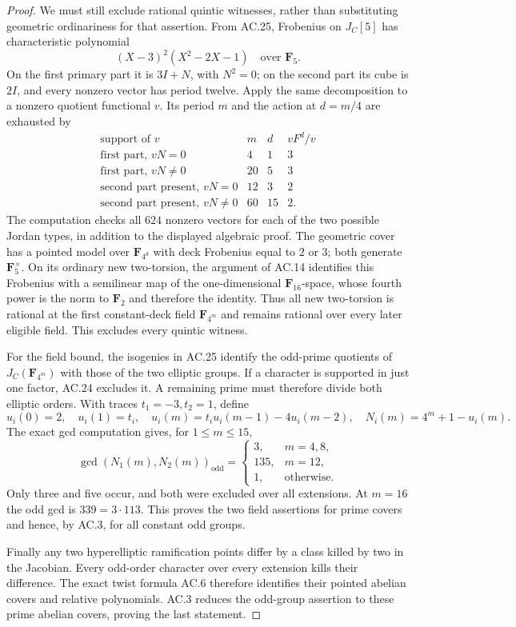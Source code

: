 \begin{proof}
We must still exclude rational quintic witnesses, rather than
substituting geometric ordinariness for that assertion.  From AC.25,
Frobenius on $J_C[5]$ has characteristic polynomial
\[
                   (X-3)^2(X^2-2X-1)\quad\text{over }\mathbf F_5.
\]
On the first primary part it is $3I+N$, with $N^2=0$; on the second
part its cube is $2I$, and every nonzero vector has period twelve.
Apply the same decomposition to a nonzero quotient functional $v$.
Its period $m$ and the action at $d=m/4$ are exhausted by
\[
 \begin{array}{c|c|c|c}
 \text{support of }v&m&d&vF^d/v\\\hline
 \text{first part, }vN=0&4&1&3\\
 \text{first part, }vN\ne0&20&5&3\\
 \text{second part present, }vN=0&12&3&2\\
 \text{second part present, }vN\ne0&60&15&2.
 \end{array}
\]
The computation checks all $624$ nonzero vectors for each of the two
possible Jordan types, in addition to the displayed algebraic proof.
The geometric cover has a pointed model over $\mathbf F_{4^d}$ with
deck Frobenius equal to $2$ or $3$; both generate
$\mathbf F_5^\times$.  On its ordinary new two-torsion, the argument
of AC.14 identifies this Frobenius with a semilinear map of the
one-dimensional $\mathbf F_{16}$-space, whose fourth power is the
norm to $\mathbf F_2$ and therefore the identity.  Thus all new
two-torsion is rational at the first constant-deck field
$\mathbf F_{4^m}$ and remains rational over every later eligible
field.  This excludes every quintic witness.

For the field bound, the isogenies in AC.25 identify the odd-prime
quotients of $J_C(\mathbf F_{4^m})$ with those of the two elliptic
groups.  If a character is supported in just one factor, AC.24
excludes it.  A remaining prime must therefore divide both elliptic
orders.  With traces $t_1=-3,t_2=1$, define
\[
 u_i(0)=2,\quad u_i(1)=t_i,\quad
 u_i(m)=t_i u_i(m-1)-4u_i(m-2),\quad
 N_i(m)=4^m+1-u_i(m).
\]
The exact gcd computation gives, for $1\le m\le15$,
\[
 \gcd(N_1(m),N_2(m))_{\mathrm{odd}}=
 \begin{cases}
 3,&m=4,8,\\
 135,&m=12,\\
 1,&\text{otherwise}.
 \end{cases}
\]
Only three and five occur, and both were excluded over all
extensions.  At $m=16$ the odd gcd is $339=3\cdot113$.
This proves the two field assertions for prime covers and hence,
by AC.3, for all constant odd groups.

Finally any two hyperelliptic ramification points differ by a class
killed by two in the Jacobian.  Every odd-order character over every
extension kills their difference.  The exact twist formula AC.6
therefore identifies their pointed abelian covers and relative
polynomials.  AC.3 reduces the odd-group assertion to these prime
abelian covers, proving the last statement.
\end{proof}


